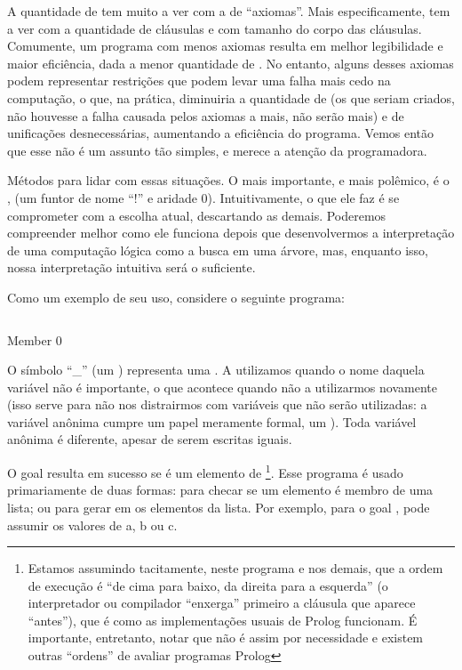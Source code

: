 A quantidade de  tem muito a ver com a de
``axiomas''. Mais especificamente, tem a ver com a quantidade de
cláusulas e com tamanho do corpo das cláusulas. Comumente, um
programa com menos axiomas resulta em melhor legibilidade e maior
eficiência, dada a menor quantidade de . No
entanto, alguns desses axiomas podem representar
restrições que podem levar uma falha mais cedo na computação, o que,
na prática, diminuiria a quantidade de  (os que
seriam criados, não houvesse a falha causada pelos axiomas a mais, não serão mais) e de
unificações desnecessárias, aumentando a eficiência do programa. Vemos
então que esse não é um assunto tão simples, e merece a atenção da programadora.

Métodos para lidar com essas situações. O mais
importante, e mais polêmico, é o ,  (um
funtor de nome ``!'' e aridade 0). Intuitivamente, o que ele faz é se
comprometer com a escolha atual, descartando as demais. Poderemos
compreender melhor como ele funciona depois que desenvolvermos a
interpretação de uma computação lógica como a busca em uma árvore,
mas, enquanto isso, nossa interpretação intuitiva será o suficiente.

Como um exemplo de seu uso, considere o seguinte programa:

\begin{listing}
  \inputminted{prolog}{../Exemplos/Cap4/prog1_member.pl}
  \caption{Member 0}
\end{listing}

O símbolo ``\_'' (um ) representa uma . A
utilizamos quando o nome daquela variável não é importante, o que
acontece quando não a utilizarmos novamente (isso serve para não nos
distrairmos com variáveis que não serão utilizadas: a variável anônima
cumpre um papel meramente formal, um ). Toda
variável anônima é diferente, apesar de serem escritas iguais.

O goal  resulta em sucesso se  é um
elemento de \footnote{Estamos assumindo tacitamente, neste
  programa e nos demais, que a ordem de execução é ``de cima para
  baixo, da direita para a esquerda'' (o interpretador ou compilador ``enxerga''
  primeiro a cláusula que aparece ``antes''), que é como as
  implementações usuais de Prolog funcionam. É importante, entretanto,
  notar que não é assim por necessidade e existem outras ``ordens'' de
  avaliar programas Prolog}. Esse programa é usado primariamente de
duas formas: para checar se um elemento é membro de uma lista; ou para
gerar em  os elementos da lista. Por exemplo, para o goal
,  pode assumir os valores de a,
b ou c.

